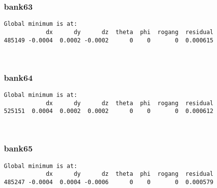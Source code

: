 \documentclass[11pt]{article}
\begin{document}
    \hypertarget{bank63}{%
\subsubsection{bank63}\label{bank63}}

    \begin{Verbatim}[commandchars=\\\{\}]
Global minimum is at:
            dx      dy      dz  theta  phi  rogang  residual
485149 -0.0004  0.0002 -0.0002      0    0       0  0.000615
    \end{Verbatim}

    \begin{center}
    \end{center}
    { \hspace*{\fill} \\}
    
    \hypertarget{bank64}{%
\subsubsection{bank64}\label{bank64}}

    \begin{Verbatim}[commandchars=\\\{\}]
Global minimum is at:
            dx      dy      dz  theta  phi  rogang  residual
525151  0.0004  0.0002  0.0002      0    0       0  0.000612
    \end{Verbatim}

    \begin{center}
    \end{center}
    { \hspace*{\fill} \\}
    
    \hypertarget{bank65}{%
\subsubsection{bank65}\label{bank65}}

    \begin{Verbatim}[commandchars=\\\{\}]
Global minimum is at:
            dx      dy      dz  theta  phi  rogang  residual
485247 -0.0004  0.0004 -0.0006      0    0       0  0.000579
    \end{Verbatim}
\end{document}
